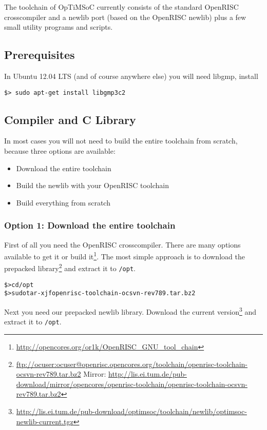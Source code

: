 The toolchain of OpTiMSoC currently consists of the standard OpenRISC
crosscompiler and a newlib port (based on the OpenRISC newlib) plus a
few small utility programs and scripts.

\subsection{Prerequisites}

In Ubuntu 12.04 LTS (and of course anywhere else) you will need
libgmp, install

\begin{verbatim}
$> sudo apt-get install libgmp3c2
\end{verbatim}

\subsection{Compiler and C Library}

In most cases you will not need to build the entire toolchain from
scratch, because three options are available:

\begin{itemize}
\item Download the entire toolchain
\item Build the newlib with your OpenRISC toolchain
\item Build everything from scratch
\end{itemize}


\subsubsection{Option 1: Download the entire toolchain}
First of all you need the OpenRISC crosscompiler. There are many
options available to get it or build it\footnote{\url{http://opencores.org/or1k/OpenRISC_GNU_tool_chain}}. The most simple
approach is to download the prepacked
library\footnote{\url{ftp://ocuser:ocuser@openrisc.opencores.org/toolchain/openrisc-toolchain-ocsvn-rev789.tar.bz2}
Mirror: \url{http://lis.ei.tum.de/pub-download/mirror/opencores/openrisc-toolchain/openrisc-toolchain-ocsvn-rev789.tar.bz2}} and extract it
to \verb|/opt|.

\begin{alltt}
\$> cd /opt
\$> sudo tar -xjf openrisc-toolchain-ocsvn-rev789.tar.bz2
\end{alltt}

Next you need our prepacked newlib library. Download the current
version\footnote{\url{http://lis.ei.tum.de/pub-download/optimsoc/toolchain/newlib/optimsoc-newlib-current.tgz}}
and extract it to \verb|/opt|.

